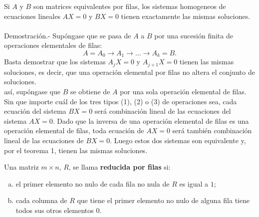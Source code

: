 \begin{teo}
    Si $A$ y $B$ son matrices equivalentes por filas, los sistemas homogeneos de ecuaciones lineales $AX=0$ y $BX=0$ tienen exactamente las mismas soluciones.\\\\
	Demostración.-\; Supóngase que se pasa de $A$ a $B$ por una sucesión finita de operaciones elementales de filas:
	$$A=A_0\to A_1 \to \ldots \to A_k = B.$$
	Basta demostrar que los sistemas $A_jX=0$ y $A_{j+1}X=0$ tienen las mismas soluciones, es decir, que una operación elemental por filas no altera el conjunto de soluciones.\\
	así, supóngase que $B$ se obtiene de $A$ por una sola operación elemental de filas. Sin que importe cuál de los tres tipos (1), (2) o (3) de operaciones sea, cada ecuación del sistema $BX=0$ será combinación lineal de las ecuaciones del sistema $AX=0$. Dado que la inversa de una operación elemental de filas es una operación elemental de filas, toda ecuación de $AX=0$ será también combinación lineal de las ecuaciones de $BX=0$. Luego estos dos sistemas son equivalente y, por el teorema 1, tienen las mismas soluciones.
\end{teo}

    \begin{def.}
	Una matriz $m\times n$, $R$, se llama \textbf{reducida por filas} si:
	\begin{enumerate}[(a)]
	    \item el primer elemento no nulo de cada fila no nula de $R$ es igual a $1$;
	    \item cada columna de $R$ que tiene el primer elemento no nulo de alguna fila tiene todos sus otros elementos $0$.
	\end{enumerate}
    \end{def.}

